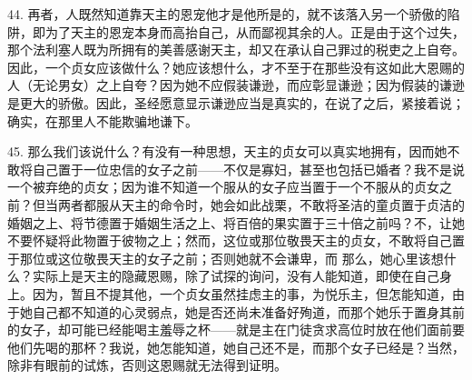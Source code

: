 44. 再者，人既然知道靠天主的恩宠他才是他所是的，就不该落入另一个骄傲的陷阱，即为了天主的恩宠本身而高抬自己，从而鄙视其余的人。正是由于这个过失，那个法利塞人既为所拥有的美善感谢天主，却又在承认自己罪过的税吏之上自夸。因此，一个贞女应该做什么？她应该想什么，才不至于在那些没有这如此大恩赐的人（无论男女）之上自夸？因为她不应假装谦逊，而应彰显谦逊；因为假装的谦逊是更大的骄傲。因此，圣经愿意显示谦逊应当是真实的，在说了之后，紧接着说；确实，在那里人不能欺骗地谦下。\par

45. 那么我们该说什么？有没有一种思想，天主的贞女可以真实地拥有，因而她不敢将自己置于一位忠信的女子之前——不仅是寡妇，甚至也包括已婚者？我不是说一个被弃绝的贞女；因为谁不知道一个服从的女子应当置于一个不服从的贞女之前？但当两者都服从天主的命令时，她会如此战栗，不敢将圣洁的童贞置于贞洁的婚姻之上、将节德置于婚姻生活之上、将百倍的果实置于三十倍之前吗？不，让她不要怀疑将此物置于彼物之上；然而，这位或那位敬畏天主的贞女，不敢将自己置于那位或这位敬畏天主的女子之前；否则她就不会谦卑，而 那么，她心里该想什么？实际上是天主的隐藏恩赐，除了试探的询问，没有人能知道，即使在自己身上。因为，暂且不提其他，一个贞女虽然挂虑主的事，为悦乐主，但怎能知道，由于她自己都不知道的心灵弱点，她是否还尚未准备好殉道，而那个她乐于置身其前的女子，却可能已经能喝主羞辱之杯——就是主在门徒贪求高位时放在他们面前要他们先喝的那杯？我说，她怎能知道，她自己还不是，而那个女子已经是？当然，除非有眼前的试炼，否则这恩赐就无法得到证明。\par

